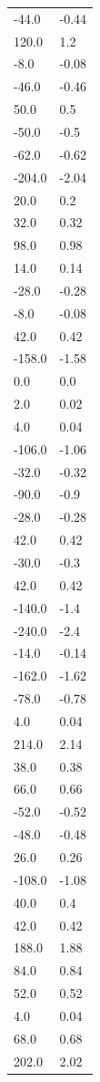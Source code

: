 \begin{longtable}{ll}
-44.0 & -0.44 \\
120.0 & 1.2 \\
-8.0 & -0.08 \\
-46.0 & -0.46 \\
50.0 & 0.5 \\
-50.0 & -0.5 \\
-62.0 & -0.62 \\
-204.0 & -2.04 \\
20.0 & 0.2 \\
32.0 & 0.32 \\
98.0 & 0.98 \\
14.0 & 0.14 \\
-28.0 & -0.28 \\
-8.0 & -0.08 \\
42.0 & 0.42 \\
-158.0 & -1.58 \\
0.0 & 0.0 \\
2.0 & 0.02 \\
4.0 & 0.04 \\
-106.0 & -1.06 \\
-32.0 & -0.32 \\
-90.0 & -0.9 \\
-28.0 & -0.28 \\
42.0 & 0.42 \\
-30.0 & -0.3 \\
42.0 & 0.42 \\
-140.0 & -1.4 \\
-240.0 & -2.4 \\
-14.0 & -0.14 \\
-162.0 & -1.62 \\
-78.0 & -0.78 \\
4.0 & 0.04 \\
214.0 & 2.14 \\
38.0 & 0.38 \\
66.0 & 0.66 \\
-52.0 & -0.52 \\
-48.0 & -0.48 \\
26.0 & 0.26 \\
-108.0 & -1.08 \\
40.0 & 0.4 \\
42.0 & 0.42 \\
188.0 & 1.88 \\
84.0 & 0.84 \\
52.0 & 0.52 \\
4.0 & 0.04 \\
68.0 & 0.68 \\
202.0 & 2.02 \\

\end{longtable}
